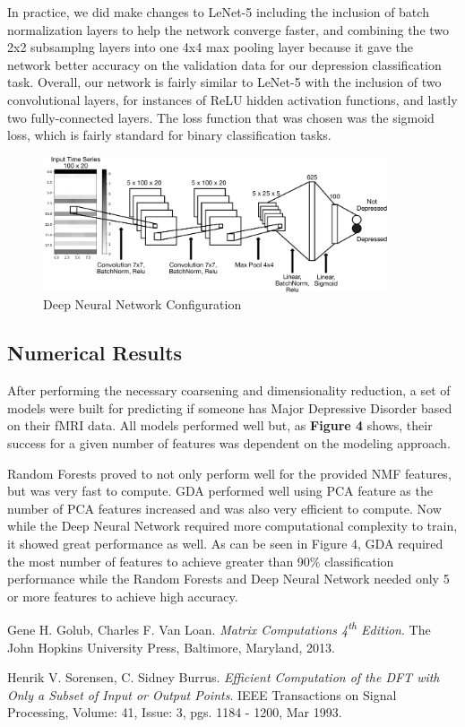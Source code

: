 \documentclass{article}[12pt]
\begin{document}
   In practice, we did make changes to LeNet-5 including the inclusion of batch normalization layers to help the network converge faster, and combining the two 2x2 subsamplng layers into one 4x4 max pooling layer because it gave the network better accuracy on the validation data for our depression classification task. Overall, our network is fairly similar to LeNet-5 with the inclusion of two convolutional layers, for instances of ReLU hidden activation functions, and lastly two fully-connected layers. The loss function that was chosen was the sigmoid loss, which is fairly standard for binary classification tasks.  
   
   \begin{figure}[!htb]
   	\centering
   	\includegraphics[width=4in]{DNN_diagram_annotated.pdf}
   	\caption{Deep Neural Network Configuration}
   	\label{fig:dnnConfig}
   \end{figure}
   
   
   \subsection{Numerical Results}
   After performing the necessary coarsening and dimensionality reduction, a set of models were built for predicting if someone has Major Depressive Disorder based on their fMRI data.  All models performed well but, as \textbf{Figure 4} shows, their success for a given number of features was dependent on the modeling approach. 
   
   Random Forests proved to not only perform well for the provided NMF features, but was very fast to compute. GDA performed well using PCA feature as the number of PCA features increased and was also very efficient to compute. Now while the Deep Neural Network required more computational complexity to train, it showed great performance as well. As can be seen in Figure 4, GDA required the most number of features to achieve greater than 90\% classification performance while the Random Forests and Deep Neural Network needed only 5 or more features to achieve high accuracy.
   
   \newpage
   \begin{thebibliography}{9}
   	Gene H. Golub, Charles F. Van Loan. 
   	\textit{Matrix Computations 4\textsuperscript{th} Edition}. 
   	The John Hopkins University Press, Baltimore, Maryland, 2013.
   	
   	Henrik V. Sorensen, C. Sidney Burrus.
   	\textit{Efficient Computation of the DFT with Only a Subset of Input or Output Points}.
   	IEEE Transactions on Signal Processing, Volume: 41, Issue: 3, pgs. 1184 - 1200, Mar 1993.
   \end{thebibliography}
   
   
   \newpage
\begin{appendices}

\end{appendices}   
   
   
   
\end{document}
